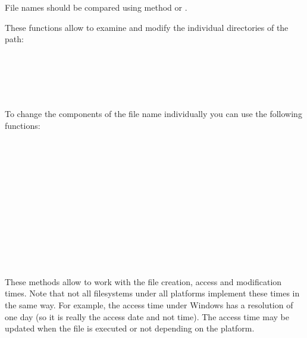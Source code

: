 File names should be compared using  method
or .


\label{filenamecomponents}

These functions allow to examine and modify the individual directories of the
path:

\\
\\
\\
\\

To change the components of the file name individually you can use the
following functions:

\\
\\
\\
\\
\\
\\
\\
\\
\\
\\
\\


\label{filenameoperations}

These methods allow to work with the file creation, access and modification
times. Note that not all filesystems under all platforms implement these times
in the same way. For example, the access time under Windows has a resolution of
one day (so it is really the access date and not time). The access time may be
updated when the file is executed or not depending on the platform.

\\
\\
\\

